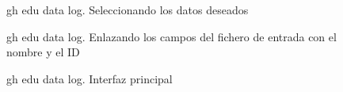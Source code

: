 \begin{figure}[H]
    \centering
    \caption{gh edu data log. Seleccionando los datos deseados}
    \label{fig:data-desiredData}
\end{figure}

\begin{figure}[H]
    \centering
    \caption{gh edu data log. Enlazando los campos del fichero de entrada con el nombre y el ID}
    \label{fig:linkFields}
\end{figure}

\begin{figure}[H]
    \centering
    \caption{gh edu data log. Interfaz principal}
    \label{fig:interface-log}
\end{figure}

